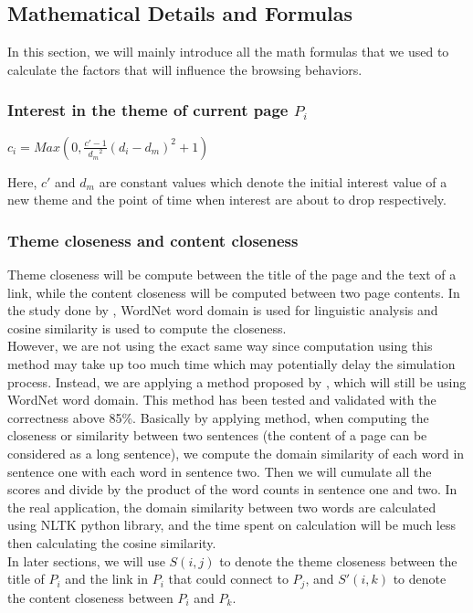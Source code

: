 \documentclass[12pt]{report}
\begin{document}
\subsection{Mathematical Details and Formulas}
In this section, we will mainly introduce all the math formulas that we used to calculate the factors that will influence the browsing behaviors.

\subsubsection{Interest in the theme of current page \(P_i\)}
\begin{center}
\(c_i = Max(0, \frac{c'-1}{{d_m}^2}(d_i - d_m)^2 + 1)\)
\end{center}
Here, \(c'\) and \(d_m\) are constant values which denote the initial interest value of a new theme and the point of time when interest are about to drop respectively.

\subsubsection{Theme closeness and content closeness}
Theme closeness will be compute between the title of the page and the text of a link, while the content closeness will be computed between two page contents. In the study done by \citet{yang}, WordNet word domain is used for linguistic analysis and cosine similarity is used to compute the closeness.\\

However, we are not using the exact same way since computation using this method may take up too much time which may potentially delay the simulation process. Instead, we are applying a method proposed by \citet{closeness}, which will still be using WordNet word domain. This method has been tested and validated with the correctness above 85\%. Basically by applying method, when computing the closeness or similarity between two sentences (the content of a page can be considered as a long sentence), we compute the domain similarity of each word in sentence one with each word in sentence two. Then we will cumulate all the scores and divide by the product of the word counts in sentence one and two. In the real application, the domain similarity between two words are calculated using NLTK python library, and the time spent on calculation will be much less then calculating the cosine similarity.\\

In later sections, we will use \(S(i, j)\) to denote the theme closeness between the title of \(P_i\) and the link in \(P_i\) that could connect to \(P_j\), and \(S'(i, k)\) to denote the content closeness between \(P_i\) and \(P_k\).
\end{document}
